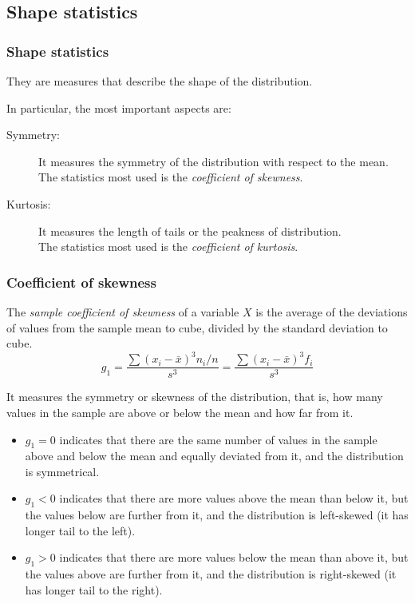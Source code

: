 \subsection{Shape statistics}
\begin{frame}
\frametitle{Shape statistics}
They are measures that describe the shape of the distribution. 

In particular, the most important aspects are:
\begin{description}
\item[Symmetry:] It measures the symmetry of the distribution with respect to the mean. \\
The statistics most used is the \emph{coefficient of skewness}.
\item[Kurtosis:] It measures the length of tails or the peakness of distribution. \\
The statistics most used is the \emph{coefficient of kurtosis}.
\end{description}
\end{frame}


\begin{frame}
\frametitle{Coefficient of skewness}
\begin{definition}
The \emph{sample coefficient of skewness} of a variable $X$ is the average of the deviations of values from the sample
mean to cube, divided by the standard deviation to cube. 
\[
g_1 = \frac{\sum (x_i-\bar x)^3 n_i/n}{s^3} = \frac{\sum (x_i-\bar x)^3 f_i}{s^3}
\]
\end{definition}

It measures the symmetry or skewness of the distribution, that is, how many values in the
sample are above or below the mean and how far from it. 
\begin{itemize}
\item $g_1=0$ indicates that there are the same number of values in the sample above and below the mean and
equally deviated from it, and the distribution is symmetrical.
\item $g_1<0$ indicates that there are more values above the mean than below it, but the values below are further from
it, and the distribution is left-skewed (it has longer tail to the left). 
\item $g_1>0$ indicates that there are more values below the mean than above it, but the values above are further from
it, and the distribution is right-skewed (it has longer tail to the right).  
\end{itemize}
\end{frame}


